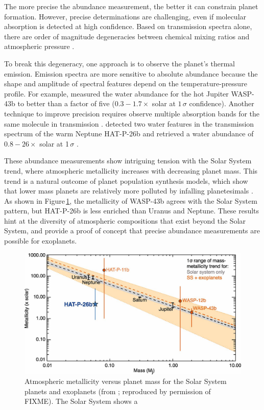 \documentclass[graybox,natbib,nosecnum]{svmult}
\begin{document}
The more precise the abundance measurement, the better it can constrain planet formation. However, precise determinations are challenging, even if molecular absorption is detected at high confidence.  Based on transmission spectra alone, there are order of magnitude degeneracies between chemical mixing ratios and atmospheric pressure \citep{benneke12, griffith13, kreidberg15b}.  

To break this degeneracy, one approach is to observe the planet's thermal emission.  Emission spectra are more sensitive to absolute abundance because the shape and amplitude of spectral features depend on the temperature-pressure profile. For example, \cite{stevenson17} measured the water abundance for the hot Jupiter WASP-43b to better than a factor of five  ($0.3 - 1.7\times$ solar at $1\,\sigma$ confidence). Another technique to improve precision requires observe multiple absorption bands for the same molecule in transmission \citep{benneke12}.  \cite{wakeford17} detected two water features in the transmission spectrum of the warm Neptune HAT-P-26b and retrieved a water abundance of $0.8 - 26\times$ solar at 1\,$\sigma$ \citep{wakeford17}.

These abundance measurements show intriguing tension with the Solar System trend, where atmospheric metallicity increases with decreasing planet mass. This trend is a natural outcome of planet population synthesis models, which show that lower mass planets are relatively more polluted by infalling planetesimals \citep{fortney13, mordasini16}. As shown in Figure\,\ref{fig:massZ}, the metallicity of WASP-43b agrees with the Solar System pattern, but HAT-P-26b is less enriched than Uranus and Neptune. These results hint at the diversity of atmospheric compositions that exist beyond the Solar System, and provide a proof of concept that precise abundance measurements are possible for exoplanets. 
 
\begin{figure}
\begin{centering}
\includegraphics[scale=.8]{Figures/wakeford.jpg}
\caption{Atmospheric metallicity versus planet mass for the Solar System planets and exoplanets (from \citealt{wakeford17}; reproduced by permission of FIXME). The Solar System shows a  }
\label{fig:massZ}       
\end{centering}
\end{figure}
\end{document}
